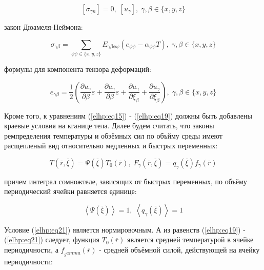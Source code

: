 \begin{equation}
    \label{elhp:eq17}
    \left[ \sigma_{\gamma n} \right] = 0, \; \left[ u_{\gamma} \right], \; \gamma,\beta \in \{x,y,z\} 
\end{equation}

закон Дюамеля-Неймона:

\begin{equation}
    \label{elhp:eq18}
    \sigma_{\gamma\beta} = \sum_{ \phi\psi \in \{x,y,z\} }
    E_{\gamma\beta\phi\psi} 
    \left( e_{\phi\psi} - \alpha_{\phi\psi}T \right) 
    , \;
    \gamma,\beta \in \{x,y,z\} 
\end{equation}

формулы для компонента тензора деформаций:

\begin{equation}
    \label{elhp:eq19}
    e_{\gamma\beta} = \frac{1}{2}
    \left( 
        \frac{\partial u_{\gamma}}{\partial \beta} \varepsilon +
        \frac{\partial u_{\gamma}}{\partial \beta} \varepsilon +
        \frac{\partial u_{\gamma}}{\partial \xi_{\beta}} +
        \frac{\partial u_{\gamma}}{\partial \xi_{\beta}}
    \right) 
    , \;
    \gamma,\beta \in \{x,y,z\} 
\end{equation}

Кроме того, к уравнениям 
(\ref{elhp:eq15})
-
(\ref{elhp:eq19})
должны быть добавлены краевые условия на кганице тела.
Далее будем считать, что законы ремпределения температуры и обэёмных сил по объйму среды имеют расщепленый вид относительно  медленных и быстрых
переменных:

\begin{equation}
    \label{elhp:eq20}
    T \left( \overline{r}, \overline{\xi} \right) = \Psi \left( \overline{\xi}  \right) T_0 \left( \overline{r}  \right) 
    , \;
    F_{\gamma} \left( \overline{r}, \overline{\xi} \right) = q_{\gamma} \left( \overline{\xi}  \right) f_{\gamma} \left( \overline{r}  \right) 
\end{equation}

причем интеграл сомножтеле, зависящих от быстрых переменных, по объёму периодический ячейки равняется единице:

\begin{equation}
    \label{elhp:eq21}
    \left< \Psi \left( \overline{\xi}  \right)  \right> = 1
    ,\;
    \left< q_{\gamma} \left( \overline{\xi}  \right)  \right> = 1
\end{equation}

Условие 
(\ref{elhp:eq21})
является нормировочным. А из равенств 
(\ref{elhp:eq19})
-
(\ref{elhp:eq21})
следует, функция 
$T_0 \left(  \overline{r} \right) $ 
является средней температурой в 
ячейке периодичности, а 
$f_{_gamma} \left( \overline{r}  \right) $
- средней объёмной силой, действующей на ячейку периодичности: 

